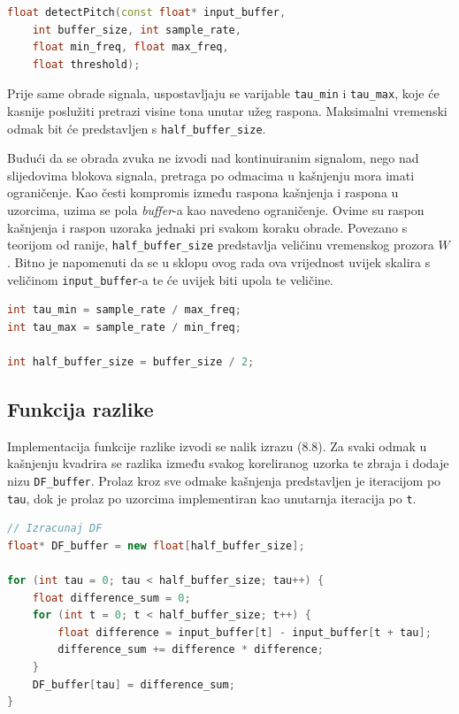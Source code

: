 \documentclass[times, utf8, diplomski, numeric]{fer}
\begin{document}
\begin{lstlisting}[language=C++, frame=single]
float detectPitch(const float* input_buffer,
	int buffer_size, int sample_rate,
	float min_freq, float max_freq,
	float threshold);
\end{lstlisting}

Prije same obrade signala, uspostavljaju se varijable \lstinline[basicstyle=\ttfamily]|tau_min| i \lstinline[basicstyle=\ttfamily]|tau_max|, koje će kasnije poslužiti pretrazi visine tona unutar užeg raspona. Maksimalni vremenski odmak bit će predstavljen s \lstinline[basicstyle=\ttfamily]|half_buffer_size|. 

Budući da se obrada zvuka ne izvodi nad kontinuiranim signalom, nego nad slijedovima blokova signala, pretraga po odmacima u kašnjenju mora imati ograničenje. Kao česti kompromis između raspona kašnjenja i raspona u uzorcima, uzima se pola \textit{buffer}-a kao navedeno ograničenje. Ovime su raspon kašnjenja i raspon uzoraka jednaki pri svakom koraku obrade. Povezano s teorijom od ranije, \lstinline[basicstyle=\ttfamily]|half_buffer_size| predstavlja veličinu vremenskog prozora $W$. Bitno je napomenuti da se u sklopu ovog rada ova vrijednost uvijek skalira s veličinom \lstinline[basicstyle=\ttfamily]|input_buffer|-a te će uvijek biti upola te veličine.

\begin{lstlisting}[language=C++, frame=single]
int tau_min = sample_rate / max_freq;
int tau_max = sample_rate / min_freq;

int half_buffer_size = buffer_size / 2;
\end{lstlisting}

\subsection{Funkcija razlike}
%
Implementacija funkcije razlike izvodi se nalik izrazu (8.8). Za svaki odmak u kašnjenju kvadrira se razlika između svakog koreliranog uzorka te zbraja i dodaje nizu \lstinline[basicstyle=\ttfamily]|DF_buffer|. Prolaz kroz sve odmake kašnjenja predstavljen je iteracijom po \lstinline[basicstyle=\ttfamily]|tau|, dok je prolaz po uzorcima implementiran kao unutarnja iteracija po \lstinline[basicstyle=\ttfamily]|t|.

\begin{lstlisting}[language=C++, frame=single]
// Izracunaj DF
float* DF_buffer = new float[half_buffer_size];

for (int tau = 0; tau < half_buffer_size; tau++) {
	float difference_sum = 0;
	for (int t = 0; t < half_buffer_size; t++) {
		float difference = input_buffer[t] - input_buffer[t + tau];
		difference_sum += difference * difference;
	}
	DF_buffer[tau] = difference_sum;
}
\end{lstlisting}
\end{document}
